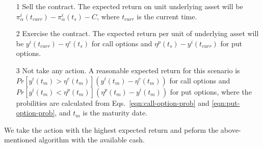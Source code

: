 \documentclass{article}
\begin{document}
\begin{itemize}

   \item[1] Sell the contract. The expected return on unit underlying
     asset will be $\pi^{i}_{\alpha}(t_{curr}) -
     \pi^{i}_{\alpha}(t_{s}) - C$, where $t_{curr}$ is the current
     time. 

   \item[2] Exercise the contract. The expected return per unit of
     underlying asset will be $y^{i}(t_{curr}) - \eta^{c}(t_{s})$
     for call options and $\eta^{p}(t_{s}) - y^{i}(t_{curr})$ for
     put options.

   \item[3] Not take any action. A reasonable expected return for this
     scenario is $Pr[ y^{i}(t_{m}) > \eta^{c}(t_{m}) ] (y^{i}(t_{m}) -
     \eta^{c}(t_{m}))$ for call options and $Pr[ y^{i}(t_{m}) <
       \eta^{p}(t_{m}) ] (\eta^{p}(t_{m}) - y^{i}(t_{m}))$ for put
     options, where the probilities are calculated from
     Eqs.~\ref{eqn:call-option-prob} and \ref{eqn:put-option-prob},
     and $t_{m}$ is the maturity date.

\end{itemize}

We take the action with the highest expected return and peform the
above-mentioned algorithm with the available cash.
\end{document}
